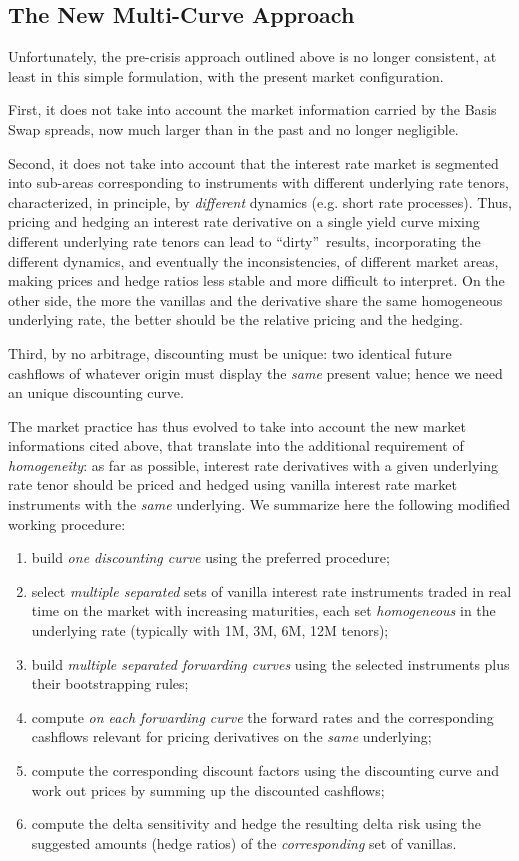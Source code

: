 \documentclass[11pt,reqno]{amsart}
\begin{document}
\subsection{\label{sec:MultiCurve}The New Multi-Curve Approach}
\par
Unfortunately, the pre-crisis approach outlined above is no longer consistent, at least in this simple formulation, with the present market configuration.
\par
First, it does not take into account the market information carried by the Basis Swap spreads, now much larger than in the past and no longer negligible.
\par
Second, it does not take into account that the interest rate market is segmented into sub-areas corresponding to instruments with different underlying rate tenors, characterized, in principle, by \emph{different} dynamics (e.g. short rate processes). Thus, pricing and hedging an interest rate derivative on a single yield curve mixing different underlying rate tenors can lead to \textquotedblleft dirty\textquotedblright\ results, incorporating the different dynamics, and eventually the inconsistencies, of different market areas, making prices and hedge ratios less stable and more difficult to interpret. On the other side, the more the vanillas and the derivative share the same homogeneous underlying rate, the better should be the relative pricing and the hedging.
\par
Third, by no arbitrage, discounting must be unique: two identical future cashflows of whatever origin must display the \emph{same} present value; hence we need an unique discounting curve.
\par
The market practice has thus evolved to take into account the new market informations cited above, that translate into the additional requirement of \emph{homogeneity}: as far as possible, interest rate derivatives with a given underlying rate tenor should be priced and hedged using vanilla interest rate market instruments with the \emph{same} underlying. We summarize here the following modified working procedure:
\begin{enumerate}
\item build \emph{one discounting curve} using the preferred procedure;
\item select \emph{multiple separated} sets of vanilla interest rate instruments traded in real time on the market with increasing maturities, each set \emph{homogeneous} in the underlying rate (typically with 1M, 3M, 6M, 12M tenors);
\item build \emph{multiple separated forwarding curves} using the selected instruments plus their bootstrapping rules;
\item compute \emph{on each forwarding curve} the forward rates and the corresponding cashflows relevant for pricing derivatives on the \emph{same} underlying;
\item compute the corresponding discount factors using the discounting curve and work out prices by summing up the discounted cashflows;
\item compute the delta sensitivity and hedge the resulting delta risk using the suggested amounts (hedge ratios) of the \emph{corresponding} set of vanillas.
\end{enumerate}
\end{document}
